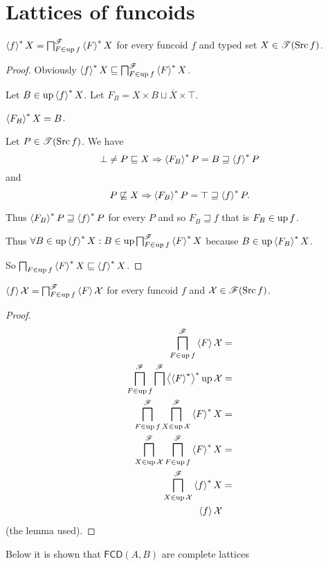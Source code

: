\section{Lattices of funcoids}
\begin{lem}\label{fcd-up-x-lem}
$\rsupfun fX=\bigsqcap_{F\in\up f}^{\mathscr{F}}\rsupfun FX$ for
every funcoid $f$ and typed set $X\in\mathscr{T}(\Src f)$.\end{lem}
\begin{proof}
Obviously $\rsupfun fX\sqsubseteq\bigsqcap_{F\in\up f}^{\mathscr{F}}\rsupfun
FX$.

Let $B\in\up\rsupfun fX$. Let $F_{B}=X\times B\sqcup\overline{X}\times\top$.

$\rsupfun{F_{B}}X=B$.

Let $P\in\mathscr{T}(\Src f)$. We have
\[
\bot\ne P\sqsubseteq
X\Rightarrow\rsupfun{F_{B}}P=B\sqsupseteq\rsupfun fP
\]
and
\[
P\nsqsubseteq
X\Rightarrow\rsupfun{F_{B}}P=\top\sqsupseteq\rsupfun fP.
\]


Thus $\rsupfun{F_{B}}P\sqsupseteq\rsupfun fP$ for every $P$ and
so $F_{B}\sqsupseteq f$ that
is $F_{B}\in\up f$.

Thus $\forall B\in\up\rsupfun fX:B\in\up\bigsqcap_{F\in\up
f}^{\mathscr{F}}\rsupfun FX$
because $B\in\up\rsupfun{F_{B}}X$.

So $\bigsqcap_{F\in\up f}\rsupfun FX\sqsubseteq\rsupfun fX$.\end{proof}
\begin{thm}
\label{fcd-up-x}$\supfun f\mathcal{X}=\bigsqcap_{F\in\up f}^{\mathscr{F}}\supfun
F\mathcal{X}$
for every funcoid $f$ and $\mathcal{X}\in\mathscr{F}(\Src f)$.\end{thm}
\begin{proof}
~
\begin{align*}
\bigsqcap_{F\in\up f}^{\mathscr{F}}\supfun F\mathcal{X} & =\\
\bigsqcap_{F\in\up f}^{\mathscr{F}}\bigsqcap^{\mathscr{F}}\rsupfun{\rsupfun F}\up\mathcal{X} & =\\
\bigsqcap_{F\in\up
f}^{\mathscr{F}}\bigsqcap_{X\in\up\mathcal{X}}^{\mathscr{F}}\rsupfun FX & =\\
\bigsqcap_{X\in\up\mathcal{X}}^{\mathscr{F}}\bigsqcap_{F\in\up
f}^{\mathscr{F}}\rsupfun FX & =\\
\bigsqcap_{X\in\up\mathcal{X}}^{\mathscr{F}}\rsupfun fX & =\\
\supfun f\mathcal{X}
\end{align*}
(the lemma used).
\end{proof}
Below it is shown that $\mathsf{FCD}(A,B)$ are complete lattices
